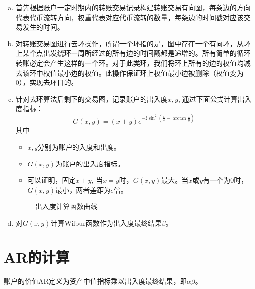 \documentclass[12pt]{article}
\begin{document}
 \begin{enumerate}[(a)]
\item 首先根据账户一定时期内的转账交易记录构建转账交易有向图，每条边的方向代表代币流转方向，权重代表对应代币流转的数量，每条边的时间戳对应该交易发生的时间。
\item 对转账交易图进行去环操作，所谓一个环指的是，图中存在一个有向环，从环上某个点出发绕环一周所经过的所有边的时间戳都是递增的。所有简单的循环转账必定会产生这样的一个环。对于此类环，我们将环上所有的边的权值均减去该环中权值最小边的权值。此操作保证环上权值最小边被删除（权值变为0），实现去环目的。
\item 针对去环算法后剩下的交易图，记录账户的出入度$x,y$, 通过下面公式计算出入度指标：
	$$G(x,y) = (x+y)e^{-2\sin^2(\frac{\pi}{4}-\arctan \frac{x}{y}) }$$
其中
	\begin{itemize}
	    \item $x,y$分别为账户的入度和出度。
	    \item $G(x,y)$为账户的出入度指标。
	    \item 可以证明，固定$x+y$, 当$x=y$时，$G(x,y)$最大。当$x$或$y$有一个为0时，$G(x,y)$最小，两者差距为$e$倍。
	\end{itemize}
\begin{figure}
	\centering
	
	\caption{出入度计算函数曲线 \label{fig-surf}}
\end{figure}
\item 对$G(x,y)$计算Wilbur函数作为出入度最终结果$\beta$。
\end{enumerate}

\section*{AR的计算}
账户的价值AR定义为资产中值指标乘以出入度最终结果，即$\alpha\beta$。
\end{document}
